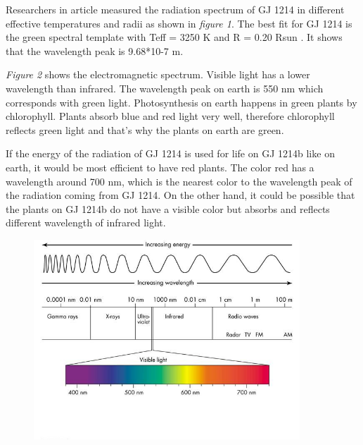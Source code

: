 \documentclass[12pt,a4paper]{article}
\begin{document}
Researchers in article \cite{Anglada_2013} measured the radiation spectrum of GJ 1214 in different effective temperatures and radii as shown in \textit{figure 1}. The best fit for GJ 1214 is the green spectral template with Teff = 3250 K and R = 0.20 Rsun \cite{Anglada_2013}. It shows that the wavelength peak is 9.68*10-7 m. 

\textit{Figure 2} shows the electromagnetic spectrum. Visible light has a lower wavelength than infrared. The wavelength peak on earth is 550 nm which corresponds with green light. Photosynthesis on earth happens in green plants by chlorophyll. Plants absorb blue and red light very well, therefore chlorophyll reflects green light \cite{ijms15034657} and that’s why the plants on earth are green. 

If the energy of the radiation of GJ 1214 is used for life on GJ 1214b like on earth, it would be most efficient to have red plants. The color red has a wavelength around 700 nm, which is the nearest color to the wavelength peak of the radiation coming from GJ 1214. 
On the other hand, it could be possible that the plants on GJ 1214b do not have a visible color but absorbs and reflects different wavelength of infrared light. 

\begin{figure}
  \includegraphics[width=100mm]{EMSpectrumcolor.jpg}\\   
  \vspace{-13ex}
  \label{fig:Electromagnetic spectrum}
 \end{figure}





\end{document}

